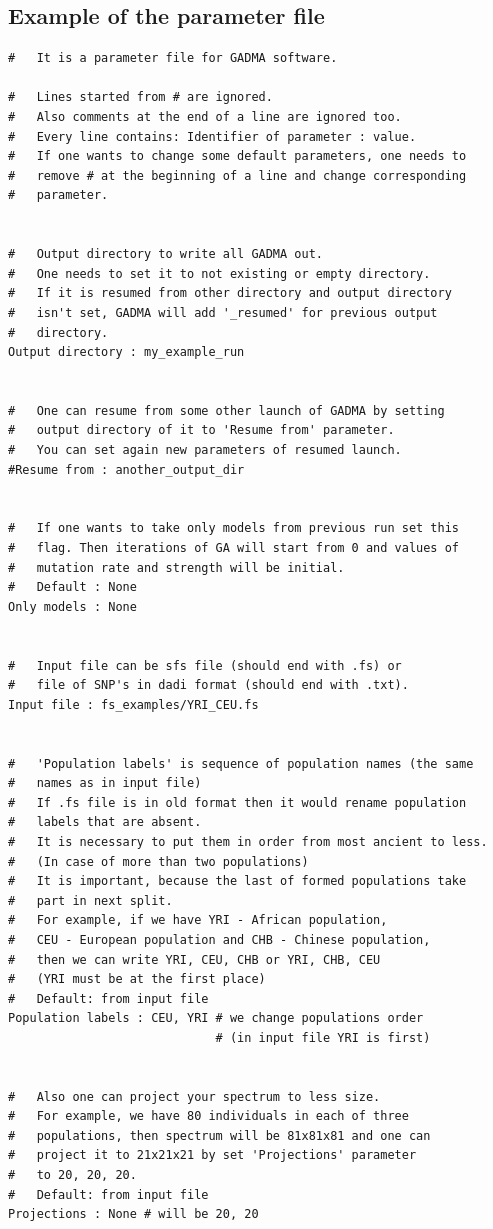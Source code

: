 \documentclass[12pt]{article}
\begin{document}
\newpage
\begin{appendices}
\section{Example of the parameter file}
\label{sec:example-params}
\begin{lstlisting}
#   It is a parameter file for GADMA software.

#   Lines started from # are ignored.
#   Also comments at the end of a line are ignored too.
#   Every line contains: Identifier of parameter : value.
#   If one wants to change some default parameters, one needs to
#   remove # at the beginning of a line and change corresponding
#   parameter.


#   Output directory to write all GADMA out.
#   One needs to set it to not existing or empty directory.
#   If it is resumed from other directory and output directory 
#   isn't set, GADMA will add '_resumed' for previous output 
#   directory.
Output directory : my_example_run


#   One can resume from some other launch of GADMA by setting
#   output directory of it to 'Resume from' parameter.
#   You can set again new parameters of resumed launch.
#Resume from : another_output_dir


#   If one wants to take only models from previous run set this 
#   flag. Then iterations of GA will start from 0 and values of
#   mutation rate and strength will be initial.
#   Default : None
Only models : None


#   Input file can be sfs file (should end with .fs) or 
#   file of SNP's in dadi format (should end with .txt).
Input file : fs_examples/YRI_CEU.fs


#   'Population labels' is sequence of population names (the same
#   names as in input file)
#   If .fs file is in old format then it would rename population 
#   labels that are absent.
#   It is necessary to put them in order from most ancient to less. 
#   (In case of more than two populations)
#   It is important, because the last of formed populations take
#   part in next split.
#   For example, if we have YRI - African population,
#   CEU - European population and CHB - Chinese population,
#   then we can write YRI, CEU, CHB or YRI, CHB, CEU 
#   (YRI must be at the first place)
#   Default: from input file
Population labels : CEU, YRI # we change populations order 
                             # (in input file YRI is first)


#   Also one can project your spectrum to less size.
#   For example, we have 80 individuals in each of three 
#   populations, then spectrum will be 81x81x81 and one can 
#   project it to 21x21x21 by set 'Projections' parameter 
#   to 20, 20, 20.
#   Default: from input file
Projections : None # will be 20, 20





\end{lstlisting}
\end{appendices}
\end{document}
